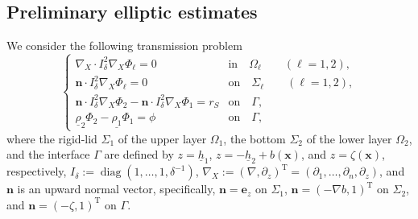 \documentclass[11pt,leqno]{article}
\numberwithin{equation}{section}
\numberwithin{figure}{section}
\begin{document}
\subsection{Preliminary elliptic estimates}
%
We consider the following transmission problem 
%
\begin{equation}\label{BVP-bilayer}
\begin{cases}
 \nabla_X\cdot I_\delta^2\nabla_X\Phi_\ell = 0 & \mbox{in}\quad \Omega_\ell \qquad (\ell=1,2), \\
 \bm{n}\cdot I_\delta^2\nabla_X\Phi_\ell = 0 & \mbox{on}\quad \Sigma_\ell \qquad (\ell=1,2), \\
 \bm{n}\cdot I_\delta^2\nabla_X\Phi_2-\bm{n}\cdot I_\delta^2\nabla_X\Phi_1 = r_S & \mbox{on}\quad \Gamma, \\
 \underline{\rho}_2\Phi_2-\underline{\rho_1}\Phi_1 = \phi & \mbox{on}\quad \Gamma,
\end{cases}
\end{equation}
%
where the rigid-lid $\Sigma_1$ of the upper layer $\Omega_1$, the bottom $\Sigma_2$ of the lower layer $\Omega_2$, 
and the interface $\Gamma$ are defined by $z=\underline{h}_1$, $z=-\underline{h}_2+b(\bm{x})$, and $z=\zeta(\bm{x})$, 
respectively, $I_\delta:=\operatorname{diag}(1,\ldots,1,\delta^{-1})$, $\nabla_X:=(\nabla,\partial_z)^\mathrm{T}=(\partial_1,\ldots,\partial_n,\partial_z)$, and 
$\bm{n}$ is an upward normal vector, specifically, $\bm{n}=\bm{e}_z$ on $\Sigma_1$, $\bm{n}=(-\nabla b, 1)^\mathrm{T}$ on 
$\Sigma_2$, and $\bm{n}=(-\zeta,1)^\mathrm{T}$ on $\Gamma$. 
\end{document}
